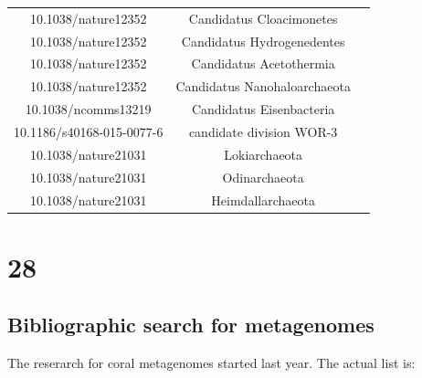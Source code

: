 \documentclass[12pt, a4paper]{report}
\begin{document}
\begin{center}
\begin{longtable}{ccc}
10.1038/nature12352	&	Candidatus Cloacimonetes	\\
10.1038/nature12352	&	Candidatus Hydrogenedentes	\\
10.1038/nature12352	&	Candidatus Acetothermia	\\
10.1038/nature12352	&	Candidatus Nanohaloarchaeota	\\
10.1038/ncomms13219	&	Candidatus Eisenbacteria	\\
10.1186/s40168-015-0077-6	&	candidate division WOR-3	\\
10.1038/nature21031 &  Lokiarchaeota \\
10.1038/nature21031 & Odinarchaeota \\
10.1038/nature21031 & Heimdallarchaeota \\

 \hline
  \end{longtable}
\end{center}

\section{28}

\subsection{Bibliographic search for metagenomes}
The reserarch for coral metagenomes started last year. The actual list is:
\end{document}
